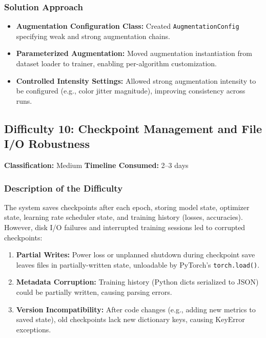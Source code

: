 \subsubsection{Solution Approach}

\begin{itemize}
    \item \textbf{Augmentation Configuration Class:} Created \texttt{AugmentationConfig} specifying weak and strong augmentation chains.
    
    \item \textbf{Parameterized Augmentation:} Moved augmentation instantiation from dataset loader to trainer, enabling per-algorithm customization.
    
    \item \textbf{Controlled Intensity Settings:} Allowed strong augmentation intensity to be configured (e.g., color jitter magnitude), improving consistency across runs.
\end{itemize}

\subsection{Difficulty 10: Checkpoint Management and File I/O Robustness}

\textbf{Classification:} Medium \quad \textbf{Timeline Consumed:} 2--3 days

\subsubsection{Description of the Difficulty}

The system saves checkpoints after each epoch, storing model state, optimizer state, learning rate scheduler state, and training history (losses, accuracies). However, disk I/O failures and interrupted training sessions led to corrupted checkpoints:

\begin{enumerate}
    \item \textbf{Partial Writes:} Power loss or unplanned shutdown during checkpoint save leaves files in partially-written state, unloadable by PyTorch's \texttt{torch.load()}.
    
    \item \textbf{Metadata Corruption:} Training history (Python dicts serialized to JSON) could be partially written, causing parsing errors.
    
    \item \textbf{Version Incompatibility:} After code changes (e.g., adding new metrics to saved state), old checkpoints lack new dictionary keys, causing KeyError exceptions.
\end{enumerate}

